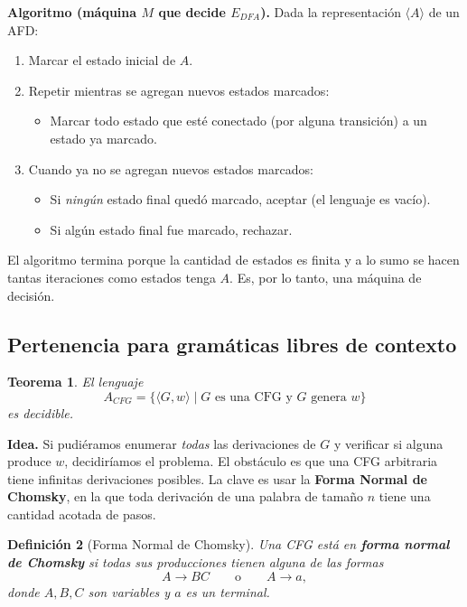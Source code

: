 \documentclass[11pt,a4paper]{article}
\theoremstyle{definicion}
\newtheorem{definicion}{Definición}[section]
\newtheorem{teorema}[definicion]{Teorema}
\newcommand{\enc}[1]{\langle #1 \rangle}
\begin{document}
\textbf{Algoritmo (máquina $M$ que decide $E_{DFA}$).} Dada la representación $\enc{A}$ de un AFD:
\begin{enumerate}
    \item Marcar el estado inicial de $A$.
    \item Repetir mientras se agregan nuevos estados marcados:
    \begin{itemize}
        \item Marcar todo estado que esté conectado (por alguna transición) a un estado ya marcado.
    \end{itemize}
    \item Cuando ya no se agregan nuevos estados marcados:
    \begin{itemize}
        \item Si \emph{ningún} estado final quedó marcado, aceptar (el lenguaje es vacío).
        \item Si algún estado final fue marcado, rechazar.
    \end{itemize}
\end{enumerate}

El algoritmo termina porque la cantidad de estados es finita y a lo sumo se hacen tantas iteraciones como estados tenga $A$. Es, por lo tanto, una máquina de decisión.

\subsection{Pertenencia para gramáticas libres de contexto}

\begin{teorema}
El lenguaje
\[
A_{CFG} = \{ \enc{G, w} \mid G \text{ es una CFG y } G \text{ genera } w \}
\]
es decidible.
\end{teorema}

\textbf{Idea.} Si pudiéramos enumerar \emph{todas} las derivaciones de $G$ y verificar si alguna produce $w$, decidiríamos el problema. El obstáculo es que una CFG arbitraria tiene infinitas derivaciones posibles. La clave es usar la \textbf{Forma Normal de Chomsky}, en la que toda derivación de una palabra de tamaño $n$ tiene una cantidad acotada de pasos.

\begin{definicion}[Forma Normal de Chomsky]
Una CFG está en \textbf{forma normal de Chomsky} si todas sus producciones tienen alguna de las formas
\[
A \to BC \qquad \text{o} \qquad A \to a,
\]
donde $A, B, C$ son variables y $a$ es un terminal.
\end{definicion}
\end{document}
